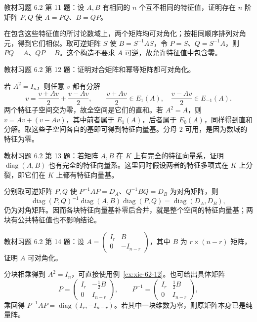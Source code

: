 \begin{example}
\label{ex:xie-62-11}
教材习题 6.2 第 11 题：设 $A,B$ 有相同的 $n$ 个互不相同的特征值，证明存在 $n$ 阶矩阵 $P,Q$ 使 $A=PQ$、$B=QP$。
\end{example}
\begin{solve}
在包含这些特征值的所讨论数域上，两个矩阵均可对角化；按相同顺序排列对角元，得到它们相似。取可逆矩阵 $S$ 使 $B=S^{-1}AS$，令 $P=S$、$Q=S^{-1}A$，则 $PQ=A$、$QP=B$。这个构造不要求 $A$ 可逆，故允许特征值中包含零。
\end{solve}

\begin{example}
\label{ex:xie-62-12}
教材习题 6.2 第 12 题：证明对合矩阵和幂等矩阵都可对角化。
\end{example}
\begin{solve}
若 $A^2=I_n$，则任意 $v$ 都有分解
\[
 v=\frac{v+Av}{2}+\frac{v-Av}{2},
 \qquad \frac{v+Av}{2}\in E_1(A),\quad
 \frac{v-Av}{2}\in E_{-1}(A).
\]
两个特征子空间交为零，故全空间是它们的直和。若 $A^2=A$，则 $v=Av+(v-Av)$，其中前者属于 $E_1(A)$，后者属于 $E_0(A)$，同样得到直和分解。取这些子空间各自的基即可得到特征向量基。分母 $2$ 可用，是因为数域的特征为零。
\end{solve}

\begin{example}
\label{ex:xie-62-13}
教材习题 6.2 第 13 题：若矩阵 $A,B$ 在 $K$ 上有完全的特征向量系，证明 $\operatorname{diag}(A,B)$ 也有完全的特征向量系。这里同时假设两者的特征多项式在 $K$ 上分裂，即它们在 $K$ 上都有特征向量基。
\end{example}
\begin{solve}
分别取可逆矩阵 $P,Q$ 使 $P^{-1}AP=D_A$、$Q^{-1}BQ=D_B$ 为对角矩阵，则
\[
 \operatorname{diag}(P,Q)^{-1}\operatorname{diag}(A,B)\operatorname{diag}(P,Q)
 =\operatorname{diag}(D_A,D_B),
\]
仍为对角矩阵。因而各块特征向量基补零后合并，就是整个空间的特征向量基；两块有公共特征值也不影响结论。
\end{solve}

\begin{example}
\label{ex:xie-62-14}
教材习题 6.2 第 14 题：设 $A=\begin{pmatrix}I_r&B\\0&-I_{n-r}\end{pmatrix}$，其中 $B$ 为 $r\times(n-r)$ 矩阵，证明 $A$ 可对角化。
\end{example}
\begin{solve}
分块相乘得到 $A^2=I_n$，可直接使用例~\ref{ex:xie-62-12}。也可给出具体矩阵
\[
 P=\begin{pmatrix}I_r&-\tfrac12B\\0&I_{n-r}\end{pmatrix},
 \qquad P^{-1}=\begin{pmatrix}I_r&\tfrac12B\\0&I_{n-r}\end{pmatrix},
\]
乘回得 $P^{-1}AP=\operatorname{diag}(I_r,-I_{n-r})$。若其中一块维数为零，则原矩阵本身已是纯量阵。
\end{solve}


